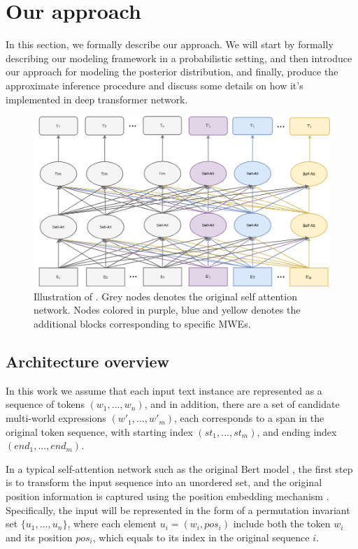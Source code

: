 

\section{Our approach}
In this section, we formally describe our \BertMWE approach.
We will start by formally describing our modeling framework in a probabilistic setting, 
and then introduce our approach for modeling the posterior distribution, 
and finally, produce the approximate inference procedure
and discuss some details on how it's implemented in deep transformer network.


\begin{figure}[tb]
    \centering
    \includegraphics[width=0.95\linewidth]{fig/architecture.png}
    \vspace{20pt}
    \caption{Illustration of \BertMWE. Grey nodes denotes the original self attention network. Nodes colored in purple, blue and yellow denotes the additional blocks corresponding to specific MWEs.}
    \vspace{10pt}
    \label{fig:variational}
\end{figure}


\subsection{Architecture overview}\label{sec:arch-overview}
In this work we assume that each input text instance are represented as a sequence of tokens $(w_1, ..., w_n)$,
and in addition, there are a set of candidate multi-world expressions $(w'_1, ..., w'_m)$, each corresponds to a span in the original token sequence, with starting index $(st_1, ..., st_m)$, and ending index $(end_1, ..., end_m)$. 

In a typical self-attention network such as the original Bert model \cite{devlin2018bert}, the first step is to transform the input sequence into an unordered set, 
and the original position information is captured using the position embedding mechanism \cite{vaswani2017attention}. Specifically, the  input will be represented in the form of a permutation invariant set $\{u_1, ..., u_n\}$, where each element $u_i=(w_i, pos_i)$ include both the token $w_i$ and its position $pos_i$, which equals to its index in the original sequence $i$.

